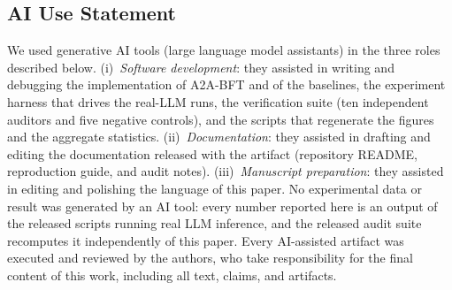 \documentclass{article}
\begin{document}
\subsection*{AI Use Statement}
We used generative AI tools (large language model assistants) in the three roles described below. (i)~\emph{Software development}: they assisted in writing and debugging the implementation of A2A-BFT and of the baselines, the experiment harness that drives the real-LLM runs, the verification suite (ten independent auditors and five negative controls), and the scripts that regenerate the figures and the aggregate statistics. (ii)~\emph{Documentation}: they assisted in drafting and editing the documentation released with the artifact (repository README, reproduction guide, and audit notes). (iii)~\emph{Manuscript preparation}: they assisted in editing and polishing the language of this paper. No experimental data or result was generated by an AI tool: every number reported here is an output of the released scripts running real LLM inference, and the released audit suite recomputes it independently of this paper. Every AI-assisted artifact was executed and reviewed by the authors, who take responsibility for the final content of this work, including all text, claims, and artifacts.
\end{document}

